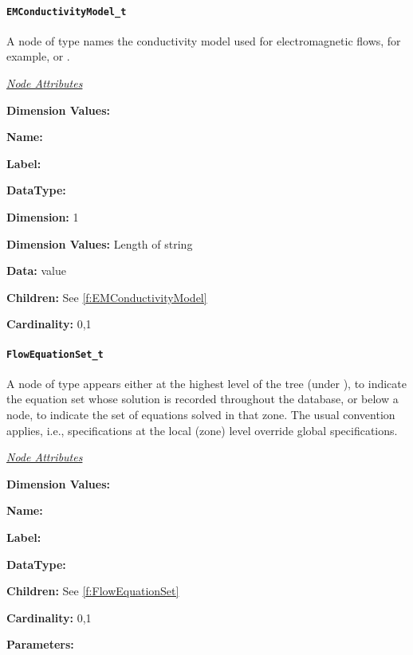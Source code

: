 \paragraph{\texttt{EMConductivityModel\_t}}

A node of type  names the conductivity
model used for electromagnetic flows, for example,
 or .

\textit{\uline{Node Attributes}}
\begin{Ventryic}{\textbf{Dimension Values:}}
\item [\textbf{Name:}]
\item [\textbf{Label:}]
\item [\textbf{DataType:}]
\item [\textbf{Dimension:}]
      1
\item [\textbf{Dimension Values:}]
      Length of string
\item [\textbf{Data:}]
       value
\item [\textbf{Children:}]
      See \autoref{f:EMConductivityModel}
\item [\textbf{Cardinality:}]
      0,1
\end{Ventryic}

\paragraph{\texttt{FlowEquationSet\_t}}

A node of type  appears either at the highest
level of the tree (under ), to indicate the equation
set whose solution is recorded throughout the database, or below a
 node, to indicate the set of equations solved in that
zone. The usual convention applies, i.e., specifications at the local
(zone) level override global specifications.

\textit{\uline{Node Attributes}}
\begin{Ventryic}{\textbf{Dimension Values:}}
\item [\textbf{Name:}]
\item [\textbf{Label:}]
\item [\textbf{DataType:}]
\item [\textbf{Children:}]
      See \autoref{f:FlowEquationSet}
\item [\textbf{Cardinality:}]
      0,1
\item [\textbf{Parameters:}]
\end{Ventryic}

